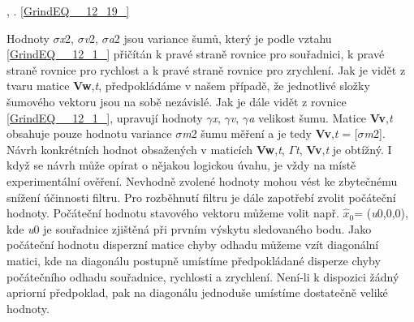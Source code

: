  ,     . \eqref{GrindEQ__12_19_}

\noindent Hodnoty $\sigma$\textit{x}2, $\sigma$\textit{v}2, $\sigma$\textit{a}2 jsou variance šumů, který je podle vztahu \eqref{GrindEQ__12_1_} přičítán k pravé straně rovnice pro souřadnici, k pravé straně rovnice pro rychlost a k pravé straně rovnice pro zrychlení. Jak je vidět z tvaru matice \textbf{Vw},\textit{t}, předpokládáme v našem případě, že jednotlivé složky šumového vektoru jsou na sobě nezávislé. Jak je dále vidět z rovnice \eqref{GrindEQ__12_1_}, upravují hodnoty $\gamma$\textit{x}, $\gamma$\textit{v}, $\gamma$\textit{a} velikost šumu. Matice \textbf{Vv},\textit{t} obsahuje pouze hodnotu variance $\sigma$\textit{m}2 šumu měření a je tedy \textbf{Vv},\textit{t} = [$\sigma$\textit{m}2]. Návrh konkrétních hodnot obsažených v maticích \textbf{Vw},\textit{t}, \textbf{$\Gamma$}\textit{t}, \textbf{Vv},\textit{t} je obtížný. I když se návrh může opírat o nějakou logickou úvahu, je vždy na místě experimentální ověření. Nevhodně zvolené hodnoty mohou vést ke zbytečnému snížení účinnosti filtru. Pro rozběhnutí filtru je dále zapotřebí zvolit počáteční hodnoty. Počáteční hodnotu stavového vektoru můžeme volit např. $\hat{x}_{0} $= (\textit{u}0,0,0), kde \textit{u}0 je souřadnice zjištěná při prvním výskytu sledovaného bodu. Jako počáteční hodnotu  disperzní matice chyby odhadu můžeme vzít diagonální matici, kde na diagonálu postupně umístíme předpokládané disperze chyby počátečního odhadu souřadnice, rychlosti a zrychlení. Není-li k dispozici žádný apriorní předpoklad, pak na diagonálu jednoduše umístíme dostatečně veliké hodnoty.

\noindent 

\noindent 

